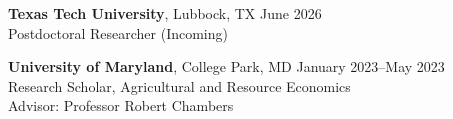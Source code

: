 
\textbf{Texas Tech University}, Lubbock, TX \hfill June 2026\\
Postdoctoral Researcher (Incoming)

\textbf{University of Maryland}, College Park, MD \hfill  January 2023--May 2023\\
Research Scholar, Agricultural and Resource Economics\\
Advisor: Professor Robert Chambers

